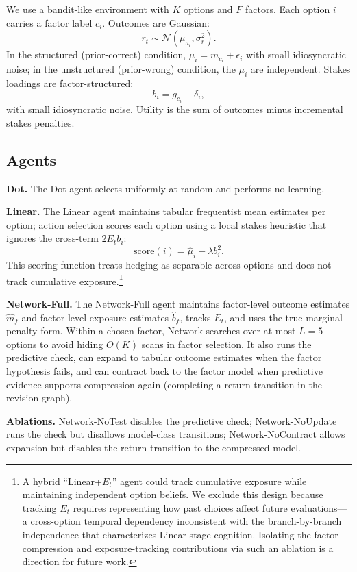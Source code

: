 \documentclass[11pt]{article}
\begin{document}
We use a bandit-like environment with $K$ options and $F$ factors. Each option $i$ carries a factor label $c_i$. Outcomes are Gaussian:
\[
r_t \sim \mathcal{N}(\mu_{a_t}, \sigma_r^2).
\]
In the structured (prior-correct) condition, $\mu_i=m_{c_i}+\epsilon_i$ with small idiosyncratic noise; in the unstructured (prior-wrong) condition, the $\mu_i$ are independent. Stakes loadings are factor-structured:
\[
b_i = g_{c_i} + \delta_i,
\]
with small idiosyncratic noise. Utility is the sum of outcomes minus incremental stakes penalties.

\subsection{Agents}

\textbf{Dot.} The Dot agent selects uniformly at random and performs no learning.

\textbf{Linear.} The Linear agent maintains tabular frequentist mean estimates per option; action selection scores each option using a local stakes heuristic that ignores the cross-term $2E_tb_i$:
\[
\text{score}(i) = \widehat{\mu}_i - \lambda b_i^2.
\]
This scoring function treats hedging as separable across options and does not track cumulative exposure.\footnote{A hybrid ``Linear+$E_t$'' agent could track cumulative exposure while maintaining independent option beliefs. We exclude this design because tracking $E_t$ requires representing how past choices affect future evaluations---a cross-option temporal dependency inconsistent with the branch-by-branch independence that characterizes Linear-stage cognition. Isolating the factor-compression and exposure-tracking contributions via such an ablation is a direction for future work.}

\textbf{Network-Full.} The Network-Full agent maintains factor-level outcome estimates $\widehat{m}_f$ and factor-level exposure estimates $\widehat{b}_f$, tracks $E_t$, and uses the true marginal penalty form. Within a chosen factor, Network searches over at most $L{=}5$ options to avoid hiding $O(K)$ scans in factor selection. It also runs the predictive check, can expand to tabular outcome estimates when the factor hypothesis fails, and can contract back to the factor model when predictive evidence supports compression again (completing a return transition in the revision graph).

\textbf{Ablations.} Network-NoTest disables the predictive check; Network-NoUpdate runs the check but disallows model-class transitions; Network-NoContract allows expansion but disables the return transition to the compressed model.
\end{document}
